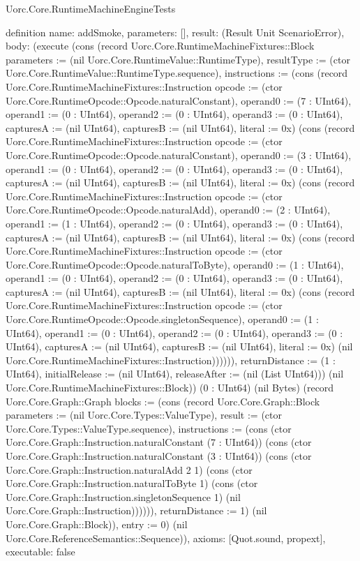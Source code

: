 \begin{lexlean}{Uorc.Core.RuntimeMachineEngineTests}
\begin{semanticmodule}
definition{
  name: addSmoke,
  parameters: [],
  result: (Result Unit ScenarioError),
  body: (execute (cons (record Uorc.Core.RuntimeMachineFixtures::Block {parameters := (nil Uorc.Core.RuntimeValue::RuntimeType), resultType := (ctor Uorc.Core.RuntimeValue::RuntimeType.sequence), instructions := (cons (record Uorc.Core.RuntimeMachineFixtures::Instruction {opcode := (ctor Uorc.Core.RuntimeOpcode::Opcode.naturalConstant), operand0 := (7 : UInt64), operand1 := (0 : UInt64), operand2 := (0 : UInt64), operand3 := (0 : UInt64), capturesA := (nil UInt64), capturesB := (nil UInt64), literal := 0x}) (cons (record Uorc.Core.RuntimeMachineFixtures::Instruction {opcode := (ctor Uorc.Core.RuntimeOpcode::Opcode.naturalConstant), operand0 := (3 : UInt64), operand1 := (0 : UInt64), operand2 := (0 : UInt64), operand3 := (0 : UInt64), capturesA := (nil UInt64), capturesB := (nil UInt64), literal := 0x}) (cons (record Uorc.Core.RuntimeMachineFixtures::Instruction {opcode := (ctor Uorc.Core.RuntimeOpcode::Opcode.naturalAdd), operand0 := (2 : UInt64), operand1 := (1 : UInt64), operand2 := (0 : UInt64), operand3 := (0 : UInt64), capturesA := (nil UInt64), capturesB := (nil UInt64), literal := 0x}) (cons (record Uorc.Core.RuntimeMachineFixtures::Instruction {opcode := (ctor Uorc.Core.RuntimeOpcode::Opcode.naturalToByte), operand0 := (1 : UInt64), operand1 := (0 : UInt64), operand2 := (0 : UInt64), operand3 := (0 : UInt64), capturesA := (nil UInt64), capturesB := (nil UInt64), literal := 0x}) (cons (record Uorc.Core.RuntimeMachineFixtures::Instruction {opcode := (ctor Uorc.Core.RuntimeOpcode::Opcode.singletonSequence), operand0 := (1 : UInt64), operand1 := (0 : UInt64), operand2 := (0 : UInt64), operand3 := (0 : UInt64), capturesA := (nil UInt64), capturesB := (nil UInt64), literal := 0x}) (nil Uorc.Core.RuntimeMachineFixtures::Instruction)))))), returnDistance := (1 : UInt64), initialRelease := (nil UInt64), releaseAfter := (nil (List UInt64))}) (nil Uorc.Core.RuntimeMachineFixtures::Block)) (0 : UInt64) (nil Bytes) (record Uorc.Core.Graph::Graph {blocks := (cons (record Uorc.Core.Graph::Block {parameters := (nil Uorc.Core.Types::ValueType), result := (ctor Uorc.Core.Types::ValueType.sequence), instructions := (cons (ctor Uorc.Core.Graph::Instruction.naturalConstant (7 : UInt64)) (cons (ctor Uorc.Core.Graph::Instruction.naturalConstant (3 : UInt64)) (cons (ctor Uorc.Core.Graph::Instruction.naturalAdd 2 1) (cons (ctor Uorc.Core.Graph::Instruction.naturalToByte 1) (cons (ctor Uorc.Core.Graph::Instruction.singletonSequence 1) (nil Uorc.Core.Graph::Instruction)))))), returnDistance := 1}) (nil Uorc.Core.Graph::Block)), entry := 0}) (nil Uorc.Core.ReferenceSemantics::Sequence)),
  axioms: [Quot.sound, propext],
  executable: false
}


\end{semanticmodule}
\end{lexlean}
